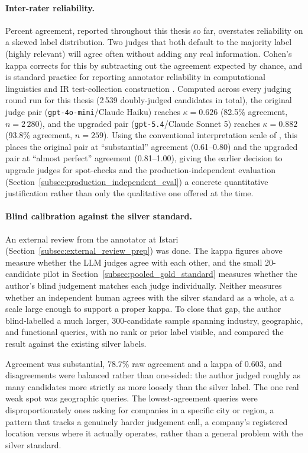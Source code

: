 \documentclass[a4paper,oneside,bibliography=totoc]{scrbook}
\begin{document}
\paragraph{Inter-rater reliability.} Percent agreement, reported throughout this thesis so far, overstates reliability on a skewed label distribution. Two judges that both default to the majority label (highly relevant) will agree often without adding any real information. Cohen's kappa \citep{cohen1960coefficient} corrects for this by subtracting out the agreement expected by chance, and is standard practice for reporting annotator reliability in computational linguistics and IR test-collection construction \citep{artstein2008inter}. Computed across every judging round run for this thesis (2\,539 doubly-judged candidates in total), the original judge pair (\texttt{gpt-4o-mini}/Claude Haiku) reaches $\kappa = 0.626$ (82.5\% agreement, $n=2\,280$), and the upgraded pair (\texttt{gpt-5.4}/Claude Sonnet 5) reaches $\kappa = 0.882$ (93.8\% agreement, $n=259$). Using the conventional interpretation scale of \citet{landis1977measurement}, this places the original pair at ``substantial'' agreement (0.61--0.80) and the upgraded pair at ``almost perfect'' agreement (0.81--1.00), giving the earlier decision to upgrade judges for spot-checks and the production-independent evaluation (Section~\ref{subsec:production_independent_eval}) a concrete quantitative justification rather than only the qualitative one offered at the time.

\paragraph{Blind calibration against the silver standard.} An external review from the annotator at Istari (Section~\ref{subsec:external_review_prep}) was done. The kappa figures above measure whether the LLM judges agree with each other, and the small 20-candidate pilot in Section~\ref{subsec:pooled_gold_standard} measures whether the author's blind judgement matches each judge individually. Neither measures whether an independent human agrees with the silver standard as a whole, at a scale large enough to support a proper kappa. To close that gap, the author blind-labelled a much larger, 300-candidate sample spanning industry, geographic, and functional queries, with no rank or prior label visible, and compared the result against the existing silver labels.

Agreement was substantial, 78.7\% raw agreement and a kappa of 0.603, and disagreements were balanced rather than one-sided: the author judged roughly as many candidates more strictly as more loosely than the silver label. The one real weak spot was geographic queries. The lowest-agreement queries were disproportionately ones asking for companies in a specific city or region, a pattern that tracks a genuinely harder judgement call, a company's registered location versus where it actually operates, rather than a general problem with the silver standard.
\end{document}

